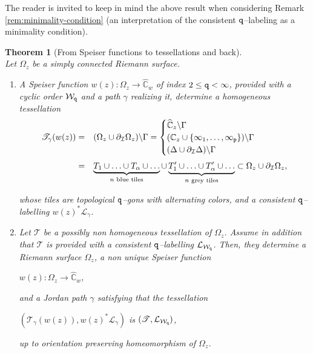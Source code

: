 \documentclass[final,3p,times]{elsarticle}
\newcommand{\CC}{\ensuremath{{\mathbb C}}}
\newcommand{\CW}{\ensuremath{{\widehat{\mathbb C}}}}
\newtheorem{theorem}{Theorem}[section]
\theoremstyle{definition}
\begin{document}
The reader is invited to keep in mind the above result when considering 
Remark \ref{rem:minimality-condition} (an interpretation of the
consistent $\tt q$--labeling as a minimality condition).

\begin{theorem}[From Speiser functions to tessellations and back]
\label{teo:principal}
\hfill\\
Let $\Omega_z$ be a simply connected 
Riemann surface.
\begin{enumerate}[label=\arabic*),leftmargin=*]
\item 
A Speiser function $w(z): \Omega_z \longrightarrow \CW_w$ of
index $2\leq {\tt q} < \infty$, 
provided with a cyclic order $\mathcal{W}_{\tt q}$ 
and a path $\gamma$ realizing it, determine
a  homogeneous tessellation 
$$
\begin{array}{rl}
\mathscr{T}_\gamma(w(z)) = &
( \Omega_z \cup \partial_{\mathcal{I}}\Omega_z ) \backslash \Gamma
= 
\begin{cases}
\CW_z \backslash \Gamma
\\
(\CC_z\cup\{\infty_1,\ldots,\infty_{\tt p} \}) 
\backslash \Gamma
\\
(\Delta \cup \partial_{\mathcal{I}} \Delta ) \backslash \Gamma
\end{cases}
\\
& \vspace{-.20cm}
\\
= &
\underbrace{
T_1 \cup \ldots \cup T_\alpha \cup \ldots  }_{ n\text{ blue tiles} }
\cup 
\underbrace{ T^\prime_1 \cup  
\ldots  \cup T^{\prime}_\alpha  \cup \ldots }_{n \text{ grey tiles}} \subset 
\Omega_z \cup \partial_{\mathcal{I}} \Omega_z, 
\end{array}
$$

\noindent  
whose tiles are topological $\tt q$--gons 
with alternating colors, and
a consistent $\tt q$--labelling $w(z)^*\mathcal{L}_\gamma$.

\smallskip 

\item
Let $\mathscr{T}$ be a possibly non homogeneous 
tessellation of $\Omega_z$.
Assume in addition that $\mathscr{T}$ is 
provided with a consistent $\tt q$--labelling $\mathcal{L}_{\mathcal{W}_{\tt q}}$.
Then, they determine 
a Riemann surface $\Omega_z$,
a non unique Speiser function

\centerline{$w(z): \Omega_z \longrightarrow \CW_w$,} 

\noindent 
and a Jordan path $\gamma$ 
satisfying that the tessellation

\centerline{
$(\mathscr{T}_\gamma(w(z)) , w(z)^* \mathcal{L}_\gamma )$ \quad is \quad
$(\mathscr{T}, \mathcal{L}_{\mathcal{W}_{\tt q}} )$, 
}

\noindent
up to
orientation preserving homeomorphism of $\Omega_z$.

\end{enumerate}
\end{theorem}
\end{document}
